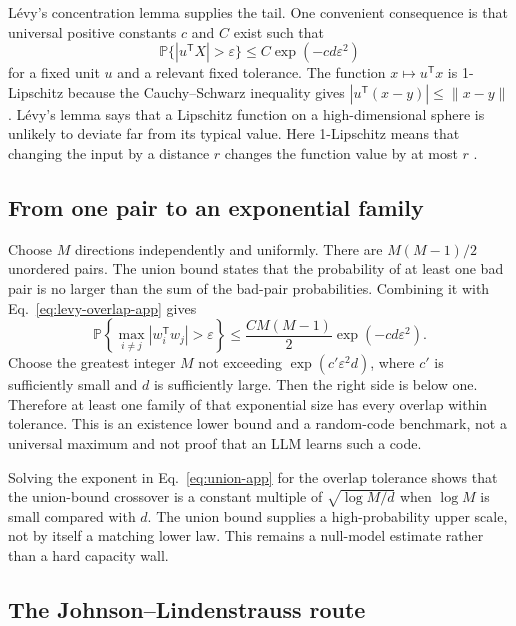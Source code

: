 \documentclass[
  aps,
  reprint,
  superscriptaddress,
  floatfix,
  nofootinbib,
  longbibliography
]{revtex4-2}
\newcommand{\Prob}{\mathbb{P}}
\newcommand{\T}{^{\mathsf T}}
\newcommand{\norm}[1]{\lVert #1\rVert}
\begin{document}
L\'evy's concentration lemma supplies the tail.  One convenient consequence
is that universal positive constants $c$ and $C$ exist such that
\begin{equation}
 \Prob\{|u\T X|>\varepsilon\}
 \leq C\exp(-c d\varepsilon^2)
 \label{eq:levy-overlap-app}
\end{equation}
for a fixed unit $u$ and a relevant fixed tolerance.  The function
$x\mapsto u\T x$ is 1-Lipschitz because the Cauchy--Schwarz inequality gives
$|u\T(x-y)|\leq\norm{x-y}$.  L\'evy's lemma says that a Lipschitz function on
a high-dimensional sphere is unlikely to deviate far from its typical value.
Here 1-Lipschitz means that changing the input by a distance $r$ changes the
function value by at most $r$
\cite{ledoux2001concentration,milman1986asymptotic}.

\subsection{From one pair to an exponential family}

Choose $M$ directions independently and uniformly.  There are
$M(M-1)/2$ unordered pairs.  The union bound states that the probability of at
least one bad pair is no larger than the sum of the bad-pair probabilities.
Combining it with Eq.~\eqref{eq:levy-overlap-app} gives
\begin{equation}
 \Prob\!\left\{
 \max_{i\ne j}|w_i\T w_j|>\varepsilon
 \right\}
 \leq \frac{C M(M-1)}{2}
 \exp(-c d\varepsilon^2).
 \label{eq:union-app}
\end{equation}
Choose the greatest integer $M$ not exceeding
$\exp(c'\varepsilon^2d)$, where $c'$ is sufficiently small and $d$ is
sufficiently large.  Then the right side is below one.  Therefore at least one
family of that exponential size has every overlap within tolerance.  This is
an existence lower bound and a random-code benchmark, not a universal maximum
and not proof that an LLM learns such a code.

Solving the exponent in Eq.~\eqref{eq:union-app} for the overlap tolerance
shows that the union-bound crossover is a constant multiple of
$\sqrt{\log M/d}$ when $\log M$ is small compared with $d$.  The union bound
supplies a high-probability upper scale, not by itself a matching lower law.
This remains a null-model estimate rather than a hard capacity wall.

\subsection{The Johnson--Lindenstrauss route}
\end{document}
